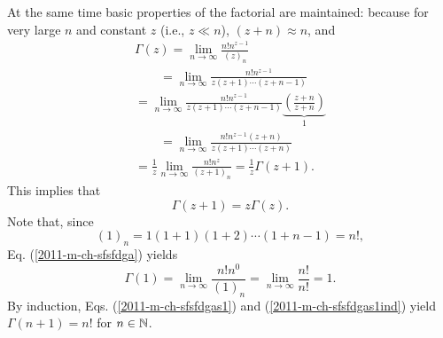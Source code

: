 At the same time basic properties of the factorial are maintained:
because for very large $n$ and constant $z$ (i.e., $z\ll n$),
$(z+n)\approx n$, and
\begin{equation}
\begin{split}
\Gamma ( z  )
=  \lim_{ n \rightarrow \infty} \frac{ n !  n ^ { z -1}  }{  ( z )_n }
\\ \qquad
=  \lim_{ n \rightarrow \infty} \frac{ n !  n ^ { z -1}  }{  z(z+1)\cdots (z+n-1) }
\\
=
\lim_{ n \rightarrow \infty} \frac{ n !  n ^ { z -1}  }{  z(z+1)\cdots (z+n-1) }
\underbrace{\left(\frac{z+n}{z+n}\right)}_{1}
\\ \qquad
=
\lim_{ n \rightarrow \infty} \frac{ n !  n ^ { z -1} (z+n) }{  z(z+1)\cdots (z+n) }
\\
=
\frac{1}{z} \lim_{ n \rightarrow \infty} \frac{ n !  n ^ z  }{  ( z +1)_n }
=
\frac{1}{z} \Gamma ( z +1 )
.
\label{2011-m-ch-sfsfdga234}
\end{split}
\end{equation}
This implies that
\begin{equation}
\Gamma ( z + 1)
=  z
\Gamma ( z  ) .
\label{2011-m-ch-sfsfdgas1ind}
\end{equation}
Note that, since
\begin{equation}
(1)_n =1 (1+1) (1+2)\cdots (1+n-1)= n! ,
\end{equation}
Eq. (\ref{2011-m-ch-sfsfdga})  yields
\begin{equation}
\Gamma ( 1)
=  \lim_{ n \rightarrow \infty} \frac{ n !  n ^ 0  }{  (  1)_ n }
=  \lim_{ n \rightarrow \infty} \frac{ n !    }{  n !}  =1
.
\label{2011-m-ch-sfsfdgas1}
\end{equation}
By induction, Eqs.
(\ref{2011-m-ch-sfsfdgas1})
and
(\ref{2011-m-ch-sfsfdgas1ind})
yield
$\Gamma ( n +1 ) =n!$ for $n\in {\Bbb N}$.

